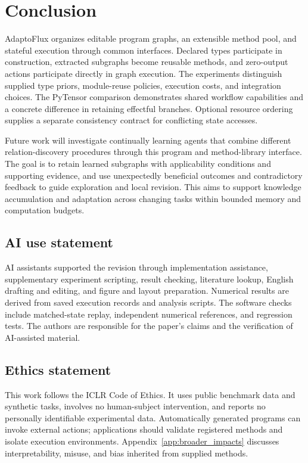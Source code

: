 \section{Conclusion}
\label{sec:conclusion}
AdaptoFlux organizes editable program graphs, an extensible method pool, and stateful execution through common interfaces. Declared types participate in construction, extracted subgraphs become reusable methods, and zero-output actions participate directly in graph execution. The experiments distinguish supplied type priors, module-reuse policies, execution costs, and integration choices. The PyTensor comparison demonstrates shared workflow capabilities and a concrete difference in retaining effectful branches. Optional resource ordering supplies a separate consistency contract for conflicting state accesses.

Future work will investigate continually learning agents that combine different relation-discovery procedures through this program and method-library interface. The goal is to retain learned subgraphs with applicability conditions and supporting evidence, and use unexpectedly beneficial outcomes and contradictory feedback to guide exploration and local revision. This aims to support knowledge accumulation and adaptation across changing tasks within bounded memory and computation budgets.
\label{maintext:end}
\clearpage

\subsection*{AI use statement}
AI assistants supported the revision through implementation assistance, supplementary experiment scripting, result checking, literature lookup, English drafting and editing, and figure and layout preparation. Numerical results are derived from saved execution records and analysis scripts. The software checks include matched-state replay, independent numerical references, and regression tests. The authors are responsible for the paper's claims and the verification of AI-assisted material.

\subsection*{Ethics statement}
This work follows the ICLR Code of Ethics. It uses public benchmark data and synthetic tasks, involves no human-subject intervention, and reports no personally identifiable experimental data. Automatically generated programs can invoke external actions; applications should validate registered methods and isolate execution environments. Appendix~\ref{app:broader_impacts} discusses interpretability, misuse, and bias inherited from supplied methods.

